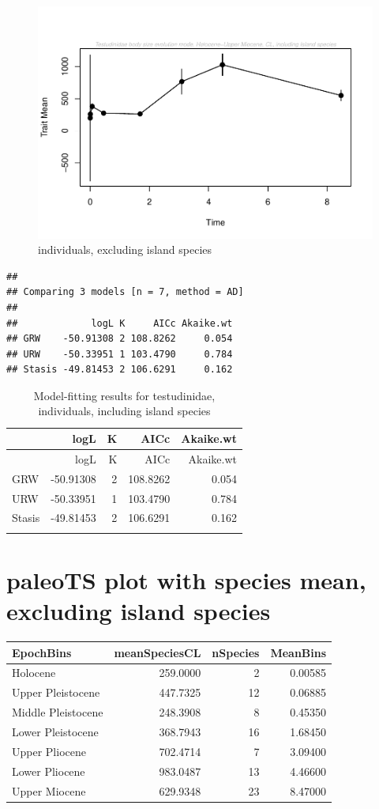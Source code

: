 \documentclass[]{article}
\begin{document}
\begin{figure}[htbp]
\centering
\includegraphics{MA_JJ_files/figure-latex/paleoTS, individuals, exluding island species-1.pdf}
\caption{individuals, excluding island species}
\end{figure}

\begin{verbatim}
## 
## Comparing 3 models [n = 7, method = AD]
## 
##             logL K     AICc Akaike.wt
## GRW    -50.91308 2 108.8262     0.054
## URW    -50.33951 1 103.4790     0.784
## Stasis -49.81453 2 106.6291     0.162
\end{verbatim}

\begin{longtable}[]{@{}lrrrr@{}}
\caption{Model-fitting results for testudinidae, individuals, including
island species}\tabularnewline
\toprule
& logL & K & AICc & Akaike.wt\tabularnewline
\midrule
\endfirsthead
\toprule
& logL & K & AICc & Akaike.wt\tabularnewline
\midrule
\endhead
GRW & -50.91308 & 2 & 108.8262 & 0.054\tabularnewline
URW & -50.33951 & 1 & 103.4790 & 0.784\tabularnewline
Stasis & -49.81453 & 2 & 106.6291 & 0.162\tabularnewline
\newpage & & & &\tabularnewline
\bottomrule
\end{longtable}

\section{paleoTS plot with species mean, excluding island
species}\label{paleots-plot-with-species-mean-excluding-island-species}

\begin{longtable}[]{@{}lrrr@{}}
\toprule
EpochBins & meanSpeciesCL & nSpecies & MeanBins\tabularnewline
\midrule
\endhead
Holocene & 259.0000 & 2 & 0.00585\tabularnewline
Upper Pleistocene & 447.7325 & 12 & 0.06885\tabularnewline
Middle Pleistocene & 248.3908 & 8 & 0.45350\tabularnewline
Lower Pleistocene & 368.7943 & 16 & 1.68450\tabularnewline
Upper Pliocene & 702.4714 & 7 & 3.09400\tabularnewline
Lower Pliocene & 983.0487 & 13 & 4.46600\tabularnewline
Upper Miocene & 629.9348 & 23 & 8.47000\tabularnewline
\bottomrule
\end{longtable}
\end{document}
